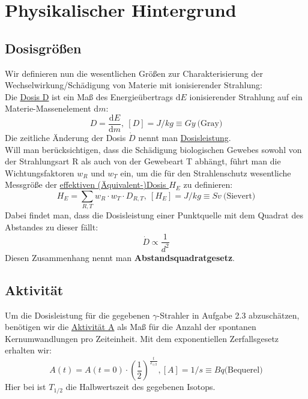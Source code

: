 \section{Physikalischer Hintergrund}
\subsection{Dosisgrößen}
Wir definieren nun die wesentlichen Größen zur Charakterisierung der Wechselwirkung/Schädigung von Materie mit ionisierender Strahlung:\\
Die \underline{Dosis D} ist ein Maß des Energieübertrags $\mathrm{d}E$ ionisierender Strahlung auf ein Materie-Massenelement $\mathrm{d}m$:
\begin{equation}\label{eq:dosis}
	D = \frac{\mathrm{d}E}{\mathrm{d}m},\ [D] = J/kg \equiv Gy\ \textrm{(Gray)}
\end{equation}
Die zeitliche Änderung der Dosis $\dot{D}$ nennt man \underline{Dosisleistung}.\\
Will man berücksichtigen, dass die Schädigung biologischen Gewebes sowohl von der Strahlungsart R als auch von der Gewebeart T abhängt, führt man die Wichtungsfaktoren $w_R$ und $w_T$ ein, um die für den Strahlenschutz wesentliche Messgröße der \underline{effektiven (Äquivalent-)Dosis $H_E$} zu definieren:
\begin{equation}
	H_E = \sum_{R,T} w_R \cdot w_T \cdot D_{R,T},\ [H_E]=J/kg \equiv Sv\ \textrm{(Sievert)}
\end{equation}
Dabei findet man, dass die Dosisleistung einer Punktquelle mit dem Quadrat des Abstandes zu dieser fällt:
\begin{equation*}
		\dot{D} \propto \frac{1}{d^2}
\end{equation*}
Diesen Zusammenhang nennt man \textbf{Abstandsquadratgesetz}.

\subsection{Aktivität}
Um die Dosisleistung für die gegebenen $\gamma$-Strahler in Aufgabe 2.3 abzuschätzen, benötigen wir die \underline{Aktivität A} als Maß für die Anzahl der spontanen Kernumwandlungen pro Zeiteinheit. Mit dem exponentiellen Zerfallsgesetz erhalten wir:
\begin{equation} \label{eq:aktivitaet}
	A(t)=A(t=0) \cdot \left(\frac{1}{2}\right)^{\frac{t}{T_{1/2}}}, [A] = 1/s \equiv Bq \textrm{(Bequerel)}
\end{equation}
Hier bei ist $T_{1/2}$ die Halbwertszeit des gegebenen Isotops.

